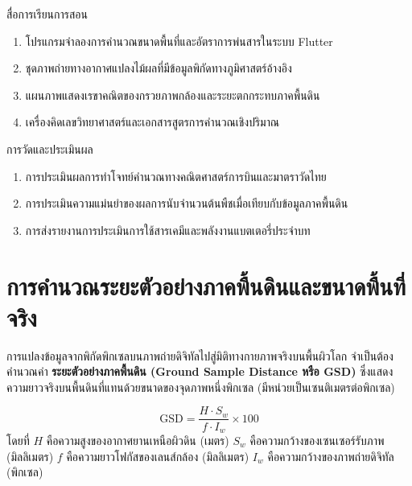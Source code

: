\begin{planbox}{สื่อการเรียนการสอน}
\begin{enumerate}
    \item โปรแกรมจำลองการคำนวณขนาดพื้นที่และอัตราการพ่นสารในระบบ Flutter
    \item ชุดภาพถ่ายทางอากาศแปลงไม้ผลที่มีข้อมูลพิกัดทางภูมิศาสตร์อ้างอิง
    \item แผนภาพแสดงเรขาคณิตของกรวยภาพกล้องและระยะตกกระทบภาคพื้นดิน
    \item เครื่องคิดเลขวิทยาศาสตร์และเอกสารสูตรการคำนวณเชิงปริมาณ
\end{enumerate}
\end{planbox}

\begin{planbox}{การวัดและประเมินผล}
\begin{enumerate}
    \item การประเมินผลการทำโจทย์คำนวณทางคณิตศาสตร์การบินและมาตราวัดไทย
    \item การประเมินความแม่นยำของผลการนับจำนวนต้นพืชเมื่อเทียบกับข้อมูลภาคพื้นดิน
    \item การส่งรายงานการประเมินการใช้สารเคมีและพลังงานแบตเตอรี่ประจำบท
\end{enumerate}
\end{planbox}

\clearpage

\section{การคำนวณระยะตัวอย่างภาคพื้นดินและขนาดพื้นที่จริง}

การแปลงข้อมูลจากพิกัดพิกเซลบนภาพถ่ายดิจิทัลไปสู่มิติทางกายภาพจริงบนพื้นผิวโลก จำเป็นต้องคำนวณค่า \textbf{ระยะตัวอย่างภาคพื้นดิน (Ground Sample Distance หรือ GSD)} ซึ่งแสดงความยาวจริงบนพื้นดินที่แทนด้วยขนาดของจุดภาพหนึ่งพิกเซล (มีหน่วยเป็นเซนติเมตรต่อพิกเซล)

\begin{formulabox}
\begin{equation}
\text{GSD} = \frac{H \cdot S_w}{f \cdot I_w} \times 100
\label{eq:gsd}
\end{equation}
โดยที่
$H$ คือความสูงของอากาศยานเหนือผิวดิน (เมตร)\newline
$S_w$ คือความกว้างของเซนเซอร์รับภาพ (มิลลิเมตร)\newline
$f$ คือความยาวโฟกัสของเลนส์กล้อง (มิลลิเมตร)\newline
$I_w$ คือความกว้างของภาพถ่ายดิจิทัล (พิกเซล)
\end{formulabox}

